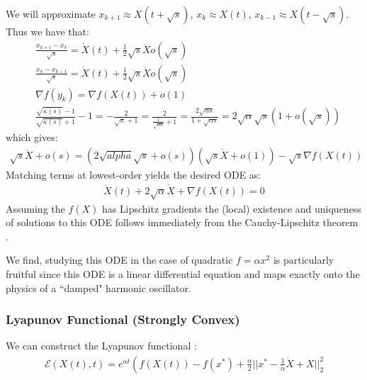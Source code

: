  We will approximate $x_{k+1} \approx X(t+\sqrt{s})$, $x_k \approx X(t)$, $x_{k-1} \approx X(t-\sqrt{s})$.
 Thus we have that:
 \begin{align*}
     & \frac{x_{k+1} - x_k}{\sqrt{s}} = \dot{X}(t) + \frac{1}{2} \sqrt{s} \ddot{X} o(\sqrt{s}) \\
     & \frac{x_k - x_{k-1}}{\sqrt{s}} = \dot{X}(t) + \frac{1}{2} \sqrt{s} \ddot{X} o(\sqrt{s}) \\
     & \nabla f(y_k) = \nabla f(X(t)) + o(1) \\
     & \frac{\sqrt{\kappa(s)}-1}{\sqrt{\kappa(s)}+1}-1 = -\frac{2}{\sqrt{\kappa}+1} = \frac{2}{\frac{1}{\sqrt{\alpha s}}+1} = \frac{2 \sqrt{\alpha s}}{1+\sqrt{\alpha s}} = 2 \sqrt{\alpha} \sqrt{s} (1+o(\sqrt{s}))
 \end{align*}
 which gives:
 \begin{align*}
     \sqrt{s} \ddot{X} + o(s) = (2 \sqrt{alpha} \sqrt{s} + o(s))(\sqrt{s} \dot{X} + o(1)) - \sqrt{s} \nabla f(X(t))
 \end{align*}
 Matching terms at lowest-order yields the desired ODE as:
 \begin{align}
     \ddot{X}(t) + 2 \sqrt{\alpha} \dot{X} + \nabla f(X(t)) = 0 \label{constantnesterovode}
 \end{align}
Assuming the $f(X)$ has Lipschitz gradients the (local) existence and uniqueness of solutions to this ODE follows immediately from the Cauchy-Lipschitz theorem \cite{teschl2012ordinary}.

We find, studying this ODE in the case of quadratic $f = \alpha x^2$ is particularly fruitful since this ODE is a linear differential equation and maps exactly onto the physics of a ``damped" harmonic oscillator.

\subsubsection{Lyapunov Functional (Strongly Convex)}

We can construct the Lyapunov functional :
\begin{align*}
    \mathcal{E}(X(t), t) = e^{\alpha t}\left ( f(X(t)) - f(x^*) + \frac{\alpha}{2}||x^*-\frac{1}{\alpha} \dot{X} + X||_2^2
\end{align*}

